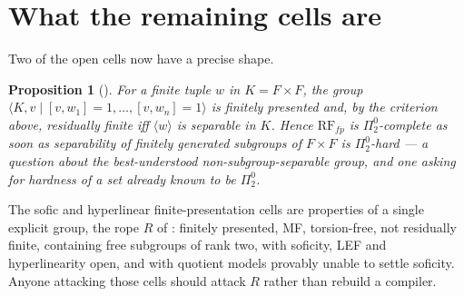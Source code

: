 \documentclass[11pt]{article}
\newtheorem{proposition}[theorem]{Proposition}
\theoremstyle{definition}
\newcommand{\Pizt}{\Pi^0_2}\newcommand{\Sizt}{\Sigma^0_2}\newcommand{\Pith}{\Pi^0_3}\newcommand{\Sith}{\Sigma^0_3}
\begin{document}
\section{What the remaining cells are}
Two of the open cells now have a precise shape.
\begin{proposition}[]
For a finite tuple $w$ in $K=F\times F$, the group $\langle K,v\mid [v,w_1]=1,\dots,[v,w_n]=1\rangle$ is finitely presented and, by the criterion above, residually finite iff $\langle w\rangle$ is separable in $K$. Hence $\mathrm{RF}_{fp}$ is $\Pizt$-complete as soon as separability of finitely generated subgroups of $F\times F$ is $\Pizt$-hard --- a question about the best-understood non-subgroup-separable group, and one asking for hardness of a set already known to be $\Pizt$.
\end{proposition}
The sofic and hyperlinear finite-presentation cells are properties of a single explicit group, the rope $R$ of : finitely presented, MF, torsion-free, not residually finite, containing free subgroups of rank two, with soficity, LEF and hyperlinearity open, and with quotient models provably unable to settle soficity. Anyone attacking those cells should attack $R$ rather than rebuild a compiler.
\end{document}
